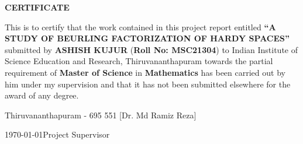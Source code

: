 \begin{center}
{\large{\bf{CERTIFICATE}}}
\end{center}
\thispagestyle{empty}


\noindent
This is to certify that the work contained in this project report entitled \textbf{``A STUDY OF BEURLING FACTORIZATION OF HARDY SPACES''}  submitted by \textbf{ASHISH KUJUR} (\textbf{Roll No: MSC21304}) to Indian Institute of Science Education and Research, Thiruvananthapuram towards the partial requirement of {\bf Master of Science} in \textbf{Mathematics} has been carried out by him under my supervision and that it has not been submitted elsewhere for the award of any degree.



\vspace{4cm}

\noindent Thiruvananthapuram - 695 551 \hfill [Dr. Md Ramiz Reza]

\noindent \today \hfill Project Supervisor

\clearpage

